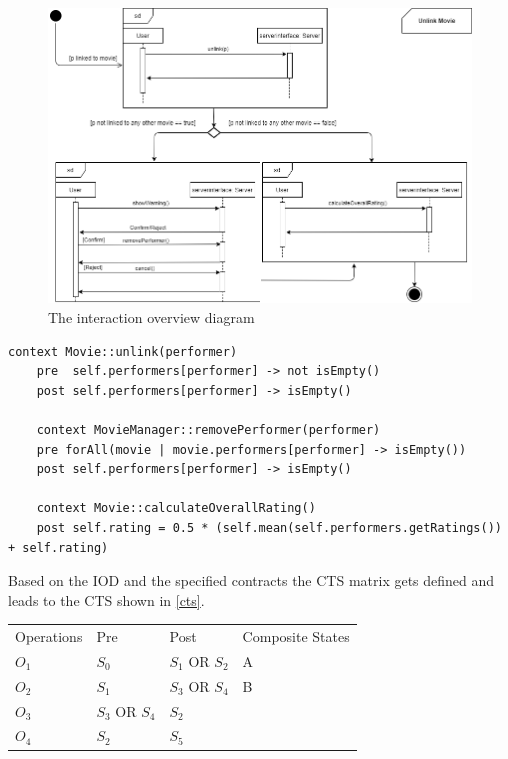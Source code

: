 \begin{figure}[h]
	\centering
	\includegraphics[width=\textwidth]{./images/iod.png}
	\caption{The interaction overview diagram}
	\label{iod}
\end{figure}

\begin{lstlisting}[caption={Contracts written in OCL},label={contracts2}]
	context Movie::unlink(performer)
	pre  self.performers[performer] -> not isEmpty()
	post self.performers[performer] -> isEmpty()
	
	context MovieManager::removePerformer(performer)
	pre forAll(movie | movie.performers[performer] -> isEmpty())
	post self.performers[performer] -> isEmpty()
	
	context Movie::calculateOverallRating()
	post self.rating = 0.5 * (self.mean(self.performers.getRatings()) + self.rating)
\end{lstlisting}

\newpage

Based on the IOD and the specified contracts the CTS matrix gets defined and leads to the CTS shown in \autoref{cts}.

\begin{longtable}[h]{llll}
	Operations & Pre & Post & Composite States \\
	$O_{1}$ & $S_{0}$ & $S_{1}$ OR $S_{2}$ & A \\
	$O_{2}$ & $S_{1}$ & $S_{3}$ OR $S_{4}$ & B \\
	$O_{3}$ & $S_{3}$ OR $S_{4}$ & $S_{2}$ & \\
	$O_{4}$ & $S_{2}$ & $S_{5}$ & \\
\end{longtable}

